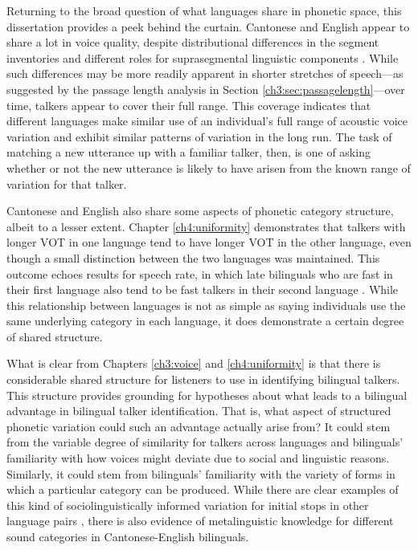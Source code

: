 Returning to the broad question of what languages share in phonetic space, this dissertation provides a peek behind the curtain. Cantonese and English appear to share a lot in voice quality, despite distributional differences in the segment inventories and different roles for suprasegmental linguistic components \citep{matthews_2013_cantonese}. While such differences may be more readily apparent in shorter stretches of speech---as suggested by the passage length analysis in Section \ref{ch3:sec:passagelength}---over time, talkers appear to cover their full range. This coverage indicates that different languages make similar use of an individual's full range of acoustic voice variation and exhibit similar patterns of variation in the long run. The task of matching a new utterance up with a familiar talker, then, is one of asking whether or not the new utterance is likely to have arisen from the known range of variation for that talker.

Cantonese and English also share some aspects of phonetic category structure, albeit to a lesser extent. Chapter \ref{ch4:uniformity} demonstrates that talkers with longer VOT in one language tend to have longer VOT in the other language, even though a small distinction between the two languages was maintained. This outcome echoes results for speech rate, in which late bilinguals who are fast in their first language also tend to be fast talkers in their second language \citep{bradlow_2017_rate}. While this relationship between languages is not as simple as saying individuals use the same underlying category in each language, it does demonstrate a certain degree of shared structure.

What is clear from Chapters \ref{ch3:voice} and \ref{ch4:uniformity} is that there is considerable shared structure for listeners to use in identifying bilingual talkers. This structure provides grounding for hypotheses about what leads to a bilingual advantage in bilingual talker identification. That is, what aspect of structured phonetic variation could such an advantage actually arise from? It could stem from the variable degree of similarity for talkers across languages and bilinguals' familiarity with how voices might deviate due to social and linguistic reasons. Similarly, it could stem from bilinguals' familiarity with the variety of forms in which a particular category can be produced. While there are clear examples of this kind of sociolinguistically informed variation for initial stops in other language pairs \citep{bullock_2009_sociophonetics}, there is also evidence of metalinguistic knowledge for different sound categories in Cantonese-English bilinguals. 

